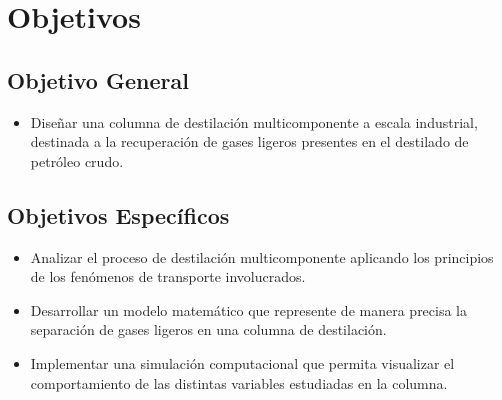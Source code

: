 \section{Objetivos}

\subsection{Objetivo General}
\begin{itemize}
    \item Diseñar una columna de destilación multicomponente a escala industrial, destinada a la recuperación de gases ligeros presentes en el destilado de petróleo crudo.
\end{itemize}

\subsection{Objetivos Específicos}
\begin{itemize}
    \item Analizar el proceso de destilación multicomponente aplicando los principios de los fenómenos de transporte involucrados.
    \item Desarrollar un modelo matemático que represente de manera precisa la separación de gases ligeros en una columna de destilación.
    \item Implementar una simulación computacional que permita visualizar el comportamiento de las distintas variables estudiadas en la columna.
\end{itemize}
